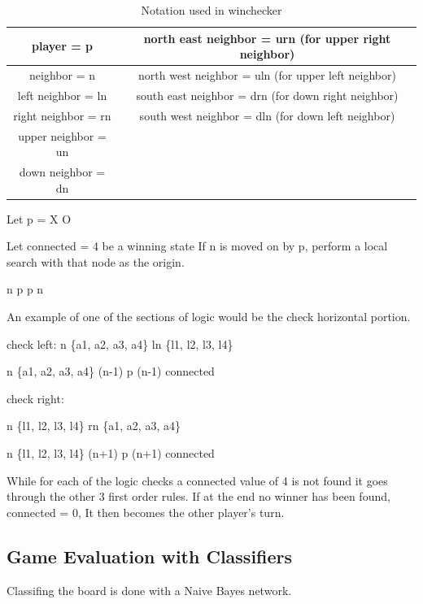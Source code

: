 \documentclass[12pt,letterpaper]{article}
\begin{document}
\begin{table}
\begin{center}
\begin{tabular}{|c||c|}
\hline
player = p & north east neighbor = urn 
(for upper right neighbor)\\
\hline 
neighbor = n & north west neighbor = uln
(for upper left neighbor)\\
\hline 
left neighbor = ln & south east neighbor = drn
(for down right neighbor)\\
\hline 
right neighbor = rn & south west neighbor = dln
(for down left neighbor)\\
\hline 
upper neighbor = un & \\
\hline 
down neighbor = dn & \\
\hline 
\end{tabular}
\end{center}
\caption{Notation used in winchecker}
\label{Notation}
\end{table}


Let p = X \bigoplus O

Let connected = 4 be a winning state If n is moved on by p, perform a local search with that node as the origin.

\exists n \ni p  \bigwedge p \in n

An example of one of the sections of logic would be the check horizontal portion.

check left:
n \in \{a1, a2, a3, a4\} \Rightarrow ln \in \{l1, l2, l3, l4\}

\neg n \in \{a1, a2, a3, a4\} \bigwedge (n-1)  \bigwedge p \in (n-1) \Rightarrow connected

check right:

n \in \{l1, l2, l3, l4\} \Rightarrow rn \in \{a1, a2, a3, a4\}

\neg n \in \{l1, l2, l3, l4\} \bigwedge (n+1)  \bigwedge p \in (n+1) \Rightarrow connected

While for each of the logic checks a connected value of 4 is not found it goes through the other 3 first order rules. If at the end no winner has been found, connected = 0, It then becomes the other player’s turn.

\subsection{Game Evaluation with Classifiers}
Classifing the board is done with a Naive Bayes network. 
\end{document}
